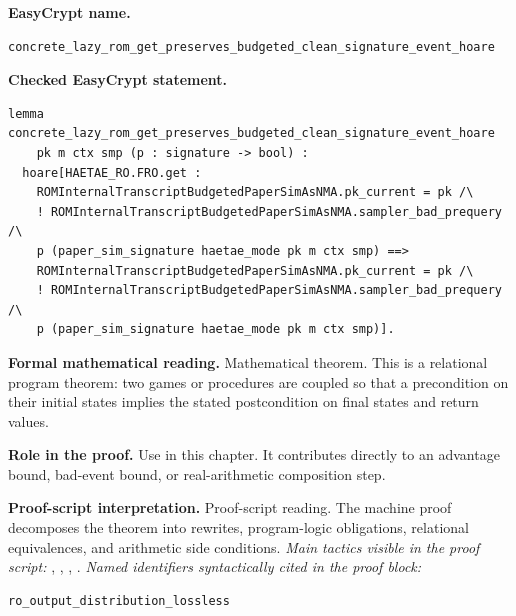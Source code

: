 \begin{formaltheorem}
\noindent\textbf{EasyCrypt name.}
\begin{lstlisting}[language=EasyCrypt,basicstyle=\ttfamily\scriptsize]
concrete_lazy_rom_get_preserves_budgeted_clean_signature_event_hoare
\end{lstlisting}
\noindent\textbf{Checked EasyCrypt statement.}
\begin{lstlisting}[language=EasyCrypt,basicstyle=\ttfamily\scriptsize]
lemma concrete_lazy_rom_get_preserves_budgeted_clean_signature_event_hoare
    pk m ctx smp (p : signature -> bool) :
  hoare[HAETAE_RO.FRO.get :
    ROMInternalTranscriptBudgetedPaperSimAsNMA.pk_current = pk /\
    ! ROMInternalTranscriptBudgetedPaperSimAsNMA.sampler_bad_prequery /\
    p (paper_sim_signature haetae_mode pk m ctx smp) ==>
    ROMInternalTranscriptBudgetedPaperSimAsNMA.pk_current = pk /\
    ! ROMInternalTranscriptBudgetedPaperSimAsNMA.sampler_bad_prequery /\
    p (paper_sim_signature haetae_mode pk m ctx smp)].
\end{lstlisting}
\noindent\textbf{Formal mathematical reading.}
Mathematical theorem. This is a relational program theorem: two games or procedures are coupled so that a precondition on their initial states implies the stated postcondition on final states and return values.

\noindent\textbf{Role in the proof.}
Use in this chapter. It contributes directly to an advantage bound, bad-event bound, or real-arithmetic composition step.

\noindent\textbf{Proof-script interpretation.}
Proof-script reading. The machine proof decomposes the theorem into rewrites, program-logic obligations, relational equivalences, and arithmetic side conditions.
\emph{Main tactics visible in the proof script:} \ec{proc}, \ec{wp}, \ec{rnd}, \ec{smt}.
\emph{Named identifiers syntactically cited in the proof block:}
\begin{lstlisting}[language=EasyCrypt,basicstyle=\ttfamily\scriptsize]
ro_output_distribution_lossless
\end{lstlisting}

\end{formaltheorem}

